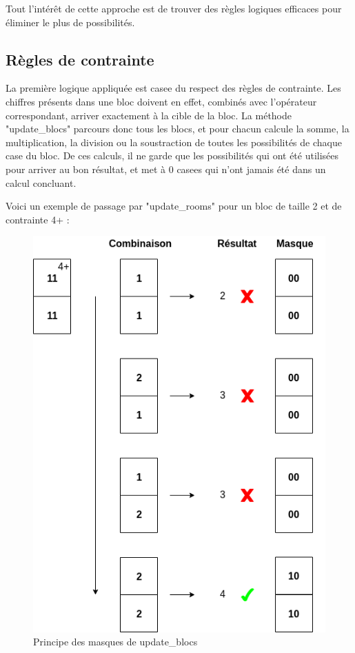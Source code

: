 \documentclass[1]{report}
\begin{document}
Tout l'intérêt de cette approche est de trouver des règles logiques efficaces pour éliminer le plus de possibilités.

\subsection{Règles de contrainte}

La première logique appliquée est casee du respect des règles de contrainte. Les chiffres présents dans une bloc doivent en effet, combinés avec l'opérateur correspondant, arriver exactement à la cible de la bloc. La méthode "update\_blocs" parcours donc tous les blocs, et pour chacun calcule la somme, la multiplication, la division ou la soustraction de toutes les possibilités de chaque case du bloc. De ces calculs, il ne garde que les possibilités qui ont été utilisées pour arriver au bon résultat, et met à 0 casees qui n'ont jamais été dans un calcul concluant.\par
Voici un exemple de passage par "update\_rooms" pour un bloc de taille 2 et de contrainte 4+ :

\begin{figure}[H]
\centering
   \includegraphics[scale=0.45]{update_rooms_changes.png}
   \caption{Principe des masques de update\_blocs}
\end{figure}
\end{document}
